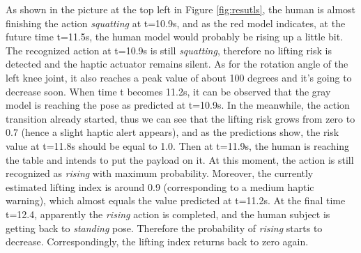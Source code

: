 As shown in the picture at the top left in Figure \ref{fig:resutls}, the human is almost finishing the action \emph{squatting} at t=10.9s, and as the red model indicates, at the future time t=11.5s, the human model would probably be rising up a little bit. The recognized action at t=10.9s is still \emph{squatting}, therefore no lifting risk is detected and the haptic actuator remains silent. As for the rotation angle of the left knee joint, it also reaches a peak value of about 100 degrees and it's going to decrease soon. When time t becomes 11.2s, it can be observed that the gray model is reaching the pose as predicted at t=10.9s. In the meanwhile, the action transition already started, thus we can see that the lifting risk grows from zero to 0.7 (hence a slight haptic alert appears), and as the predictions show, the risk value at t=11.8s should be equal to 1.0. Then at t=11.9s, the human is reaching the table and intends to put the payload on it. At this moment, the action is still recognized as \emph{rising} with maximum probability. Moreover, the currently estimated lifting index is around 0.9 (corresponding to a medium haptic warning), which almost equals the value predicted at t=11.2s. At the final time t=12.4, apparently the \emph{rising} action is completed, and the human subject is getting back to \emph{standing} pose. Therefore the probability of \emph{rising} starts to decrease. Correspondingly, the lifting index returns back to zero again.


